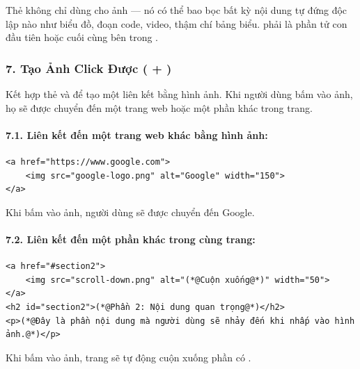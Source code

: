 \begin{noteBox}
Thẻ  không chỉ dùng cho ảnh — nó có thể bao bọc bất kỳ nội dung tự đứng độc lập nào như biểu đồ, đoạn code, video, thậm chí bảng biểu.  phải là phần tử con đầu tiên hoặc cuối cùng bên trong .
\end{noteBox}

\subsubsection{7. Tạo Ảnh Click Được ( + )}

Kết hợp thẻ  và  để tạo một liên kết bằng hình ảnh. Khi người dùng bấm vào ảnh, họ sẽ được chuyển đến một trang web hoặc một phần khác trong trang.

\paragraph{7.1. Liên kết đến một trang web khác bằng hình ảnh:}
\begin{codeWindow}
\begin{lstlisting}[language=HTML5]
<a href="https://www.google.com">
    <img src="google-logo.png" alt="Google" width="150">
</a>
\end{lstlisting}
\end{codeWindow}

Khi bấm vào ảnh, người dùng sẽ được chuyển đến Google.

\paragraph{7.2. Liên kết đến một phần khác trong cùng trang:}
\begin{codeWindow}
\begin{lstlisting}[language=HTML5]
<a href="#section2">
    <img src="scroll-down.png" alt="(*@Cuộn xuống@*)" width="50">
</a>
<h2 id="section2">(*@Phần 2: Nội dung quan trọng@*)</h2>
<p>(*@Đây là phần nội dung mà người dùng sẽ nhảy đến khi nhấp vào hình ảnh.@*)</p>
\end{lstlisting}
\end{codeWindow}

Khi bấm vào ảnh, trang sẽ tự động cuộn xuống phần có .

